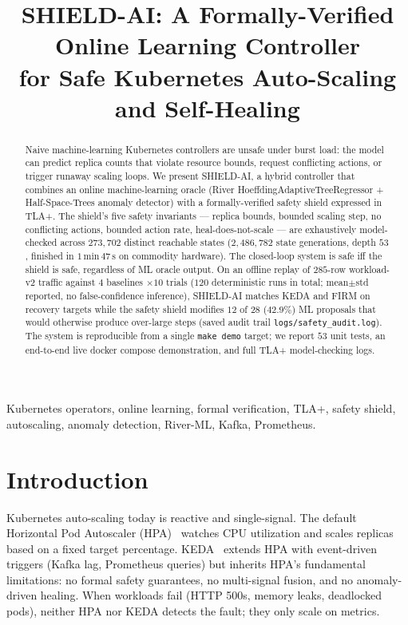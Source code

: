 \documentclass[conference,10pt]{IEEEtran}
\title{SHIELD-AI: A Formally-Verified Online Learning Controller \\
  for Safe Kubernetes Auto-Scaling and Self-Healing}
\author{
  \IEEEauthorblockN{sudo-Harshk}
  \IEEEauthorblockA{\textit{M.Tech, Department of Computer Science} \\
    \textit{[University]} \\
    [City, India] \\
    \texttt{[YOUR\_EMAIL]}}
}
\begin{document}
\maketitle

\begin{abstract}
\label{sec:abstract}
  Naive machine-learning Kubernetes controllers are unsafe under burst
  load: the model can predict replica counts that violate resource
  bounds, request conflicting actions, or trigger runaway scaling loops.
  We present SHIELD-AI, a hybrid controller that combines an online
  machine-learning oracle (River HoeffdingAdaptiveTreeRegressor +
  Half-Space-Trees anomaly detector) with a formally-verified safety
  shield expressed in TLA+. The shield's five safety invariants ---
  replica bounds, bounded scaling step, no conflicting actions, bounded
  action rate, heal-does-not-scale --- are exhaustively model-checked
  across $273{,}702$ distinct reachable states
  ($2{,}486{,}782$ state generations, depth $53$, finished in $1\,\mathrm{min}\,47\,\mathrm{s}$ on commodity hardware). The closed-loop system is safe iff the shield
  is safe, regardless of ML oracle output. On an offline replay of
  $285$-row workload-v2 traffic against $4$ baselines $\times 10$ trials ($120$ deterministic runs in total; mean$\pm$std reported, no false-confidence inference), SHIELD-AI matches KEDA and FIRM on recovery targets while the safety shield modifies $12$ of $28$ ($42.9\%$) ML proposals that would otherwise produce over-large steps (saved audit trail \texttt{logs/safety\_audit.log}). The system is reproducible from a single
  \texttt{make demo} target; we report $53$ unit tests, an end-to-end
  live docker compose demonstration, and full TLA+ model-checking logs.
\end{abstract}

\begin{IEEEkeywords}
Kubernetes operators, online learning, formal verification, TLA+, safety shield, autoscaling, anomaly detection, River-ML, Kafka, Prometheus.
\end{IEEEkeywords}

\section{Introduction}
\label{sec:intro}

Kubernetes auto-scaling today is reactive and single-signal. The default
Horizontal Pod Autoscaler (HPA)~\cite{hpa_kep} watches CPU utilization
and scales replicas based on a fixed target percentage. KEDA~\cite{keda_doc}
extends HPA with event-driven triggers (Kafka lag, Prometheus queries)
but inherits HPA's fundamental limitations: no formal safety guarantees,
no multi-signal fusion, and no anomaly-driven healing. When workloads
fail (HTTP 500s, memory leaks, deadlocked pods), neither HPA nor KEDA
detects the fault; they only scale on metrics.
\end{document}
